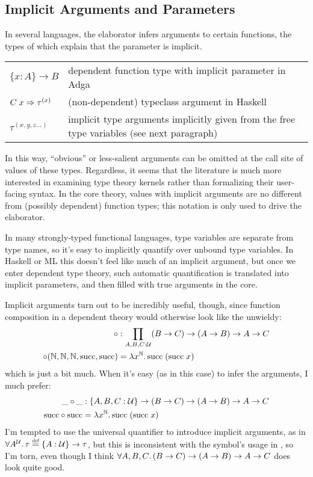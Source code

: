 \documentclass[11pt]{article} %
\theoremstyle{definition}
\theoremstyle{remark}
\begin{document}
\subsection{Implicit Arguments and Parameters}

In several languages, the elaborator infers arguments to certain functions, the types of which explain that the parameter is implicit.
\begin{center}
\renewcommand{\arraystretch}{1.2}
\begin{tabular}{lp{8.2cm}}
$\{x : A\} \to B$ & dependent function type with implicit parameter in Adga \\
$C\;x \Rightarrow \tau^{(x)}$ & (non-dependent) typeclass argument in Haskell \\
$\tau^{(x, y, z \ldots)}$ & implicit type arguments implicitly given from the free type variables (see next paragraph) \\
\end{tabular}
\end{center}
In this way, ``obvious'' or less-salient arguments can be omitted at the call site of values of these types.
Regardless, it seems that the literature is much more interested in examining type theory kernels rather than formalizing their user-facing syntax.
In the core theory, values with implicit arguments are no different from (possibly dependent) function types; this notation is only used to drive the elaborator.

In many strongly-typed functional languages, type variables are separate from type names, so it's easy to implicitly quantify over unbound type variables.
In Haskell or ML this doesn't feel like much of an implicit argument, but once we enter dependent type theory, such automatic quantification is translated into implicit parameters, and then filled with true arguments in the core.

Implicit arguments turn out to be incredibly useful, though, since function composition in a dependent theory would otherwise look like the unwieldy:
\begin{align*}
\circ &: \Pitype{A,B,C}{\mathcal U} (B \to C) \to (A \to B) \to A \to C \\
\circ(\mathbb N, \mathbb N, \mathbb N, \mathrm{succ}, \mathrm{succ}) &= \fun{x^\mathbb N}\mathrm{succ}\;(\mathrm{succ}\;x)
\end{align*}
which is just a bit much.
When it's easy (as in this case) to infer the arguments, I much prefer:
\begin{align*}
\_ \circ \_ &: \{A, B, C : \mathcal U\} \to (B \to C) \to (A \to B) \to A \to C \\
\mathrm{succ} \circ \mathrm{succ} &= {\lambda}{x^\mathbb N}.\,\mathrm{succ}\;(\mathrm{succ}\;x)
\end{align*}
I'm tempted to use the universal quantifier to introduce implicit arguments, as in $\all{A^\U}\tau \defeq \{A : \U\} \to \tau$,
  but this is inconsistent with the symbol's usage in \SystemF{}, so I'm torn, even though I think ${\forall}{A,B,C}.\,(B \to C) \to (A \to B) \to A \to C$ does look quite good.
\end{document}
